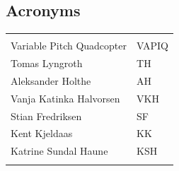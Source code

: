 \documentclass{article}
\begin{document}
\vspace*{3.0 cm}

\begin{center}
\section*{\textbf{Acronyms}}
\begin{tabular}{ll}
\rowcolor{cadetgrey}
    &   \\
Variable Pitch Quadcopter   & VAPIQ \\\rowcolor{gainsboro}
Tomas Lyngroth       & TH          \\ 
Aleksander Holthe      & AH          \\\rowcolor{gainsboro}
Vanja Katinka Halvorsen     & VKH   \\
Stian Fredriksen      & SF          \\\rowcolor{gainsboro}
Kent Kjeldaas       & KK            \\
Katrine Sundal Haune    & KSH       \\\rowcolor{gainsboro}
\end{tabular}                                                                   
\end{center}





%
\newpage

\tableofcontents
\newpage

%

%

%

%
\end{document}
